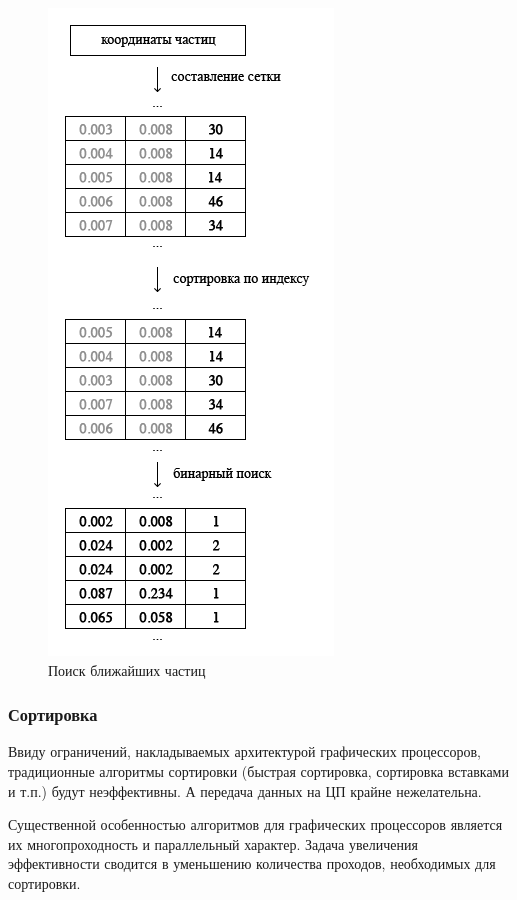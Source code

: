 \begin{figure}
\begin{center}
  \includegraphics[scale=1]{Figures/nei_search}
\end{center}
\caption{Поиск ближайших частиц}
\label{fig:nei_search}
\end{figure}


\subsubsection{Сортировка}

Ввиду ограничений, накладываемых архитектурой графических процессоров, традиционные алгоритмы
сортировки (быстрая сортировка, сортировка вставками и т.п.) будут неэффективны. А передача
данных на ЦП крайне нежелательна.

Существенной особенностью алгоритмов для графических процессоров является их многопроходность
и параллельный характер. Задача увеличения эффективности сводится в уменьшению количества
проходов, необходимых для сортировки.

